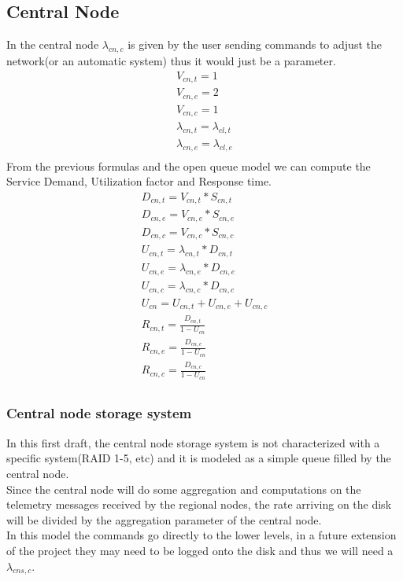 \documentclass[11pt]{article}
\begin{document}
\subsection{Central Node}
In the central node $\lambda_{cn,c}$ is given by the user sending commands to adjust the network(or an automatic system) thus it would just be a parameter.
\begin{equation}
	\begin{array}{l}
		V_{cn, t} = 1 \\
		V_{cn, e} = 2 \\ %
		V_{cn,c} = 1 \\
		\lambda_{cn, t} = \lambda_{cl,t} \\
		\lambda_{cn, e} = \lambda_{cl,e} \\
	\end{array}
\end{equation}
From the previous formulas and the open queue model we can compute the Service Demand, Utilization factor and Response time.
\begin{equation}
	\begin{array}{l}
		D_{cn, t} = V_{cn, t} * S_{cn, t} \\
		D_{cn, e} = V_{cn, e} * S_{cn, e} \\
		D_{cn, c} = V_{cn, c} * S_{cn, c} \\
		U_{cn, t} = \lambda_{cn, t} * D_{cn, t} \\
		U_{cn, e} = \lambda_{cn, e} * D_{cn, e} \\
		U_{cn, c} = \lambda_{cn, c} * D_{cn, c} \\
		U_{cn} = U_{cn, t} + U_{cn, e} + U_{cn, c} \\
		R_{cn, t} = \frac{D_{cn, t}}{1 - U_{cn}} \\
		R_{cn, e} = \frac{D_{cn, e}}{1 - U_{cn}} \\
		R_{cn, c} = \frac{D_{cn, c}}{1 - U_{cn}} \\
	\end{array}
\end{equation}

\subsubsection{Central node storage system}
In this first draft, the central node storage system is not characterized with a specific system(RAID 1-5, etc) and it is modeled as a simple queue filled by the central node.\\
Since the central node will do some aggregation and computations on the telemetry messages received by the regional nodes, the rate arriving on the disk will be divided by the aggregation parameter of the central node.\\
In this model the commands go directly to the lower levels, in a future extension of the project they may need to be logged onto the disk and thus we will need a $\lambda_{cns, c}$.
\end{document}
